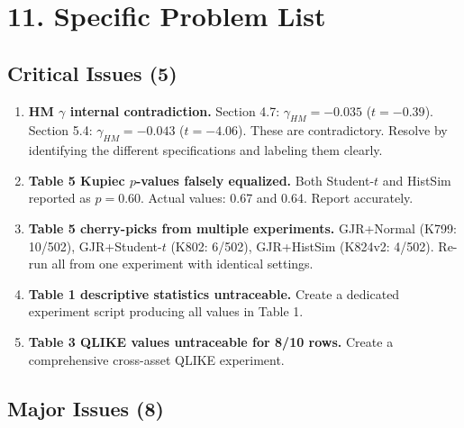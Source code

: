 \documentclass[12pt,a4paper]{article}
\begin{document}
\bigskip

\section*{11. Specific Problem List}

\subsection*{\textcolor{errorred}{Critical Issues (5)}}

\begin{enumerate}[label=C\arabic*.]
\item \textbf{HM $\gamma$ internal contradiction.} Section 4.7: $\gamma_{HM} = -0.035$ ($t = -0.39$). Section 5.4: $\gamma_{HM} = -0.043$ ($t = -4.06$). These are contradictory. Resolve by identifying the different specifications and labeling them clearly.

\item \textbf{Table 5 Kupiec $p$-values falsely equalized.} Both Student-$t$ and HistSim reported as $p = 0.60$. Actual values: 0.67 and 0.64. Report accurately.

\item \textbf{Table 5 cherry-picks from multiple experiments.} GJR+Normal (K799: 10/502), GJR+Student-$t$ (K802: 6/502), GJR+HistSim (K824v2: 4/502). Re-run all from one experiment with identical settings.

\item \textbf{Table 1 descriptive statistics untraceable.} Create a dedicated experiment script producing all values in Table 1.

\item \textbf{Table 3 QLIKE values untraceable for 8/10 rows.} Create a comprehensive cross-asset QLIKE experiment.
\end{enumerate}

\subsection*{\textcolor{warncolor}{Major Issues (8)}}
\end{document}
